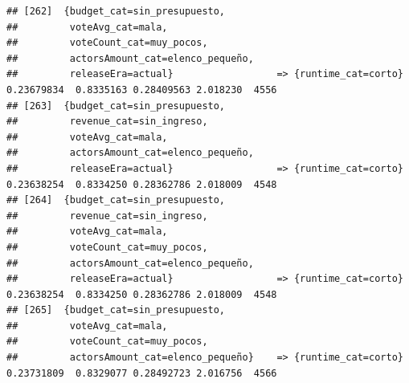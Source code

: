 \documentclass[
]{article}
\begin{document}
\begin{verbatim}
## [262]  {budget_cat=sin_presupuesto,                                                                                             
##         voteAvg_cat=mala,                                                                                                       
##         voteCount_cat=muy_pocos,                                                                                                
##         actorsAmount_cat=elenco_pequeño,                                                                                        
##         releaseEra=actual}                  => {runtime_cat=corto}               0.23679834  0.8335163 0.28409563 2.018230  4556
## [263]  {budget_cat=sin_presupuesto,                                                                                             
##         revenue_cat=sin_ingreso,                                                                                                
##         voteAvg_cat=mala,                                                                                                       
##         actorsAmount_cat=elenco_pequeño,                                                                                        
##         releaseEra=actual}                  => {runtime_cat=corto}               0.23638254  0.8334250 0.28362786 2.018009  4548
## [264]  {budget_cat=sin_presupuesto,                                                                                             
##         revenue_cat=sin_ingreso,                                                                                                
##         voteAvg_cat=mala,                                                                                                       
##         voteCount_cat=muy_pocos,                                                                                                
##         actorsAmount_cat=elenco_pequeño,                                                                                        
##         releaseEra=actual}                  => {runtime_cat=corto}               0.23638254  0.8334250 0.28362786 2.018009  4548
## [265]  {budget_cat=sin_presupuesto,                                                                                             
##         voteAvg_cat=mala,                                                                                                       
##         voteCount_cat=muy_pocos,                                                                                                
##         actorsAmount_cat=elenco_pequeño}    => {runtime_cat=corto}               0.23731809  0.8329077 0.28492723 2.016756  4566

\end{verbatim}
\end{document}
